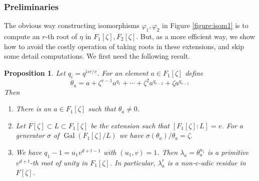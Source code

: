 \documentclass[12pt]{article}
\theoremstyle{plain}
\newtheorem{proposition}[theorem]{Proposition}
\theoremstyle{definition}
\DeclareMathOperator{\gal}{Gal} %
\begin{document}

\subsubsection{Preliminaries}

The obvious way constructing isomorphisms $\varphi_1, \varphi_2$ 
in Figure \ref{figure:isom1} is to compute an $r$-th root of $\eta$ in $F_1[\zeta], F_2[\zeta]$. 
But, as a more efficient way, we show how to avoid the costly operation of taking roots in these 
extensions, and skip some detail computations. We first need the following result.
\begin{proposition}
	\label{proposition:semi-trace}
	Let $q_i = q^{isr/v}$. For an element $a \in F_1[\zeta]$ define 
	\begin{equation}
	\label{equation:semi-trace} 
	\theta_a = a + \zeta^{v - 1}a^{q_1} + \cdots + \zeta^2a^{q_{v - 2}} + \zeta a^{q_{v - 1}}
	\end{equation}
	Then
	\begin{enumerate}
		\item[\normalfont (i)] There is an $a \in F_1[\zeta]$ such that $\theta_a \ne 0$.
		\item[\normalfont (ii)] Let $F[\zeta] \subset L \subset F_1[\zeta]$ be the extension such 
		that $[F_1[\zeta]: L] = v$. For a generator $\sigma$ of $\gal(F_1[\zeta] / L)$ we have 
		$\sigma(\theta_a) / \theta_a = \zeta$. 
		\item[\normalfont (iii)] We have $q_1 - 1 = u_1v^{d + t - 1}$ with $(u_1, v) = 1$. Then 
		$\lambda_a = \theta_a^{u_1}$ is a primitive $v^{d + t}$-th root of unity in $F_1[\zeta]$. 
		In particular, $\lambda_a^r$ is a non-$v$-adic residue in $F[\zeta]$.
	\end{enumerate}
\end{proposition}
\end{document}
